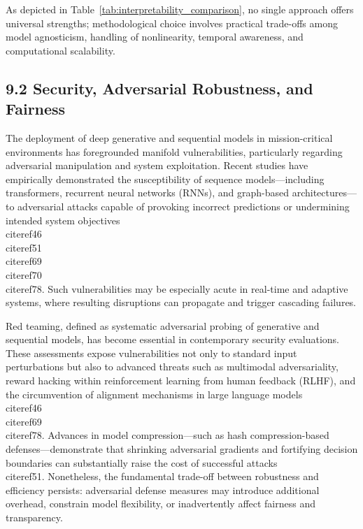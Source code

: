 \documentclass[11pt]{article}
\begin{document}
As depicted in Table~\ref{tab:interpretability_comparison}, no single approach offers universal strengths; methodological choice involves practical trade-offs among model agnosticism, handling of nonlinearity, temporal awareness, and computational scalability.

\subsection{9.2 Security, Adversarial Robustness, and Fairness}

The deployment of deep generative and sequential models in mission-critical environments has foregrounded manifold vulnerabilities, particularly regarding adversarial manipulation and system exploitation. Recent studies have empirically demonstrated the susceptibility of sequence models—including transformers, recurrent neural networks (RNNs), and graph-based architectures—to adversarial attacks capable of provoking incorrect predictions or undermining intended system objectives~\\cite{ref46}\\cite{ref51}\\cite{ref69}\\cite{ref70}\\cite{ref78}. Such vulnerabilities may be especially acute in real-time and adaptive systems, where resulting disruptions can propagate and trigger cascading failures.

Red teaming, defined as systematic adversarial probing of generative and sequential models, has become essential in contemporary security evaluations. These assessments expose vulnerabilities not only to standard input perturbations but also to advanced threats such as multimodal adversariality, reward hacking within reinforcement learning from human feedback (RLHF), and the circumvention of alignment mechanisms in large language models~\\cite{ref46}\\cite{ref69}\\cite{ref78}. Advances in model compression—such as hash compression-based defenses—demonstrate that shrinking adversarial gradients and fortifying decision boundaries can substantially raise the cost of successful attacks~\\cite{ref51}. Nonetheless, the fundamental trade-off between robustness and efficiency persists: adversarial defense measures may introduce additional overhead, constrain model flexibility, or inadvertently affect fairness and transparency.
\end{document}
